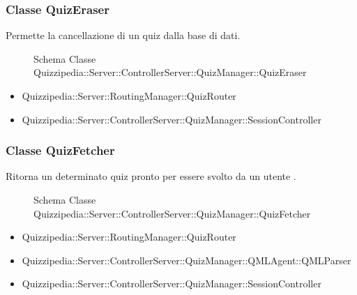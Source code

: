 \subsubsection{Classe QuizEraser}
Permette la cancellazione di un quiz dalla base di dati.
\begin{figure}[H]
\centering
\noindent{}
\caption[Schema Classe QuizEraser]{Schema Classe Quizzipedia::Server::ControllerServer::QuizManager::QuizEraser}
\end{figure}
\begin{itemize}
\item Quizzipedia::Server::RoutingManager::QuizRouter
\end{itemize}
\begin{itemize}
\item Quizzipedia::Server::ControllerServer::QuizManager::SessionController
\end{itemize}
\subsubsection{Classe QuizFetcher}
Ritorna un determinato quiz pronto per essere svolto da un utente .
\begin{figure}[H]
\centering
\noindent{}
\caption[Schema Classe QuizFetcher]{Schema Classe Quizzipedia::Server::ControllerServer::QuizManager::QuizFetcher}
\end{figure}
\begin{itemize}
\item Quizzipedia::Server::RoutingManager::QuizRouter
\end{itemize}
\begin{itemize}
\item Quizzipedia::Server::ControllerServer::QuizManager::QMLAgent::QMLParser
\item Quizzipedia::Server::ControllerServer::QuizManager::SessionController
\end{itemize}
